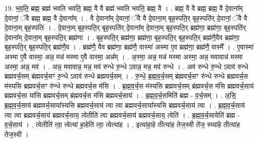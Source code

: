 \documentclass[17pt]{extarticle}
\begin{document}
19. भ॒व॒ति॒ ब्रह्म॒ ब्रह्म॑ भवति भवति॒ ब्रह्म॒ वै वै ब्रह्म॑ भवति भवति॒ ब्रह्म॒ वै । . ब्रह्म॒ वै वै ब्रह्म॒ ब्रह्म॒ वै दे॒वाना᳚म् दे॒वानां॒ ॅवै ब्रह्म॒ ब्रह्म॒ वै दे॒वाना᳚म् । . वै दे॒वाना᳚म् दे॒वानां॒ ॅवै वै दे॒वाना॒म् बृह॒स्पति॒र् बृह॒स्पति॑र् दे॒वानां॒ ॅवै वै दे॒वाना॒म् बृह॒स्पतिः॑ । . दे॒वाना॒म् बृह॒स्पति॒र् बृह॒स्पति॑र् दे॒वाना᳚म् दे॒वाना॒म् बृह॒स्पति॒र् ब्रह्म॑णा॒ ब्रह्म॑णा॒ बृह॒स्पति॑र् दे॒वाना᳚म् दे॒वाना॒म् बृह॒स्पति॒र् ब्रह्म॑णा । . बृह॒स्पति॒र् ब्रह्म॑णा॒ ब्रह्म॑णा॒ बृह॒स्पति॒र् बृह॒स्पति॒र् ब्रह्म॑णै॒वैव ब्रह्म॑णा॒ बृह॒स्पति॒र् बृह॒स्पति॒र् ब्रह्म॑णै॒व । . ब्रह्म॑णै॒ वैव ब्रह्म॑णा॒ ब्रह्म॑णै॒ वास्मा॑ अस्मा ए॒व ब्रह्म॑णा॒ ब्रह्म॑णै॒ वास्मै᳚ । . ए॒वास्मा॑ अस्मा ए॒वै वास्मा॒ अन्न॒ मन्न॑ मस्मा ए॒वै वास्मा॒ अन्न᳚म् । . अ॒स्मा॒ अन्न॒ मन्न॑ मस्मा अस्मा॒ अन्न॒ मवावान्न॑ मस्मा अस्मा॒ अन्न॒ मव॑ । . अन्न॒ मवावान्न॒ मन्न॒ मव॑ रुन्धे रु॒न्धे ऽवान्न॒ मन्न॒ मव॑ रुन्धे । . अव॑ रुन्धे रु॒न्धे ऽवाव॑ रुन्धे ब्रह्मवर्च॒सम् ब्र॑ह्मवर्च॒सꣳ रु॒न्धे ऽवाव॑ रुन्धे ब्रह्मवर्च॒सम् । . रु॒न्धे॒ ब्र॒ह्म॒व॒र्च॒सम् ब्र॑ह्मवर्च॒सꣳ रु॑न्धे रुन्धे ब्रह्मवर्च॒स म॑स्यसि ब्रह्मवर्च॒सꣳ रु॑न्धे रुन्धे ब्रह्मवर्च॒स म॑सि । . ब्र॒ह्म॒व॒र्च॒स म॑स्यसि ब्रह्मवर्च॒सम् ब्र॑ह्मवर्च॒स म॑सि ब्रह्मवर्च॒साय॑ ब्रह्मवर्च॒सा या॑सि ब्रह्मवर्च॒सम् ब्र॑ह्मवर्च॒स म॑सि ब्रह्मवर्च॒साय॑ । . ब्र॒ह्म॒व॒र्च॒समिति॑ ब्रह्म - व॒र्च॒सम् । . अ॒सि॒ ब्र॒ह्म॒व॒र्च॒साय॑ ब्रह्मवर्च॒साया᳚स्यसि ब्रह्मवर्च॒साय॑ त्वा त्वा ब्रह्मवर्च॒साया᳚स्यसि ब्रह्मवर्च॒साय॑ त्वा । . ब्र॒ह्म॒व॒र्च॒साय॑ त्वा त्वा ब्रह्मवर्च॒साय॑ ब्रह्मवर्च॒साय॒ त्वेतीति॑ त्वा ब्रह्मवर्च॒साय॑ ब्रह्मवर्च॒साय॒ त्वेति॑ । . ब्र॒ह्म॒व॒र्च॒सायेति॑ ब्रह्म - व॒र्च॒साय॑ । . त्वेतीति॑ त्वा॒ त्वेत्या॑ हा॒हेति॑ त्वा॒ त्वेत्या॑ह । . इत्या॑हा॒हे तीत्या॑ह तेज॒स्वी ते॑ज॒ स्व्या॑हे तीत्या॑ह तेज॒स्वी । \newline
\end{document}
